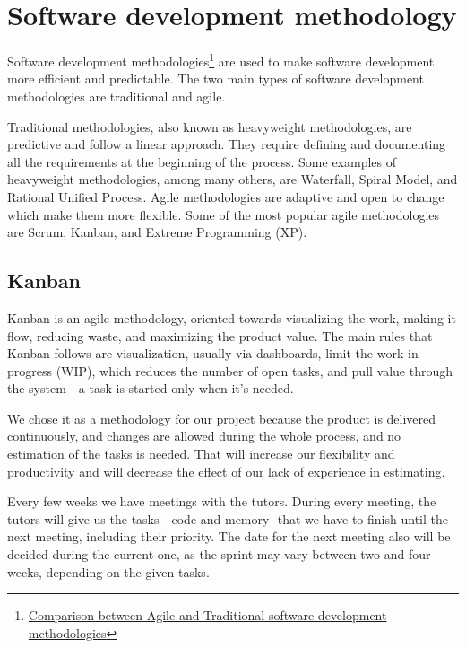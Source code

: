 \chapter{Software development methodology}
\label{Software development methodology}

Software development methodologies\footnote{\href{https://www.researchgate.net/publication/278300889_Comparison_between_Agile_and_Traditional_software_development_methodologies}{Comparison between Agile and Traditional software development methodologies}} are used to make software development more efficient and predictable. The two main types of software development methodologies are traditional and agile.
 
Traditional methodologies, also known as heavyweight methodologies, are predictive and follow a linear approach. They require defining and documenting all the requirements at the beginning of the process. Some examples of heavyweight methodologies, among many others, are Waterfall, Spiral Model, and Rational Unified Process. Agile methodologies are adaptive and open to change which make them more flexible. Some of the most popular agile methodologies are Scrum, Kanban, and Extreme Programming (XP).

\section{Kanban}
Kanban is an agile methodology, oriented towards visualizing the work, making it flow, reducing waste, and maximizing the product value. The main rules that Kanban follows are visualization, usually via dashboards, limit the work in progress (WIP), which reduces the number of open tasks, and pull value through the system - a task is started only when it’s needed.

 We chose it as a methodology for our project because the product is delivered continuously, and changes are allowed during the whole process, and no estimation of the tasks is needed. That will increase our flexibility and productivity and will decrease the effect of our lack of experience in estimating.


Every few weeks we have meetings with the tutors. During every meeting, the tutors will give us the tasks - code and memory- that we have to finish until the next meeting, including their priority. The date for the next meeting also will be decided during the current one, as the sprint may vary between two and four weeks, depending on the given tasks.

